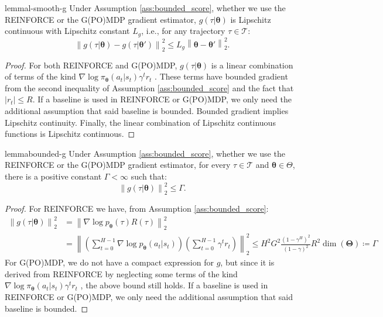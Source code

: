 \documentclass{article}
\makeatletter
\theoremstyle{remark}
\theoremstyle{definition}
\DeclareRobustCommand{\ie}{i.e.,\@\xspace}
\newcommand{\norm}[2][\infty]{\left\|#2\right\|_{#1}}
\newcommand{\vtheta}{\boldsymbol{\theta}}
\newcommand{\Tspace}{\mathcal{T}}
\newcommand{\score}[2]{\nabla\log p_{#1}(#2)}
\newcommand{\vTheta}{\boldsymbol{\Theta}}
\makeatother
\begin{document}
\begin{restatable}[]{lemma}{l-smooth-g}\label{lemma:gsmooth}
Under Assumption \ref{ass:bounded_score}, whether we use the REINFORCE or the G(PO)MDP gradient estimator, $g(\tau\vert\vtheta)$ is Lipschitz continuous with Lipschitz constant $L_g$, \ie for any trajectory $\tau\in\Tspace$:
\[
	\norm[2]{g(\tau\vert\vtheta)-g(\tau\vert\vtheta')}^2 \leq L_g\norm[2]{\vtheta-\vtheta'}^2.
\]
\end{restatable}
\begin{proof}
        For both REINFORCE and G(PO)MDP, $g(\tau\vert\vtheta)$ is a linear combination of terms of the kind $\nabla \log \pi_{\vtheta}(a_t\vert s_t)\gamma^t r_t$ \cite{peters2008reinforcement}. These terms have bounded gradient from the second inequality of Assumption \ref{ass:bounded_score} and the fact that $|r_t|\leq R$. If a baseline is used in REINFORCE or G(PO)MDP, we only need the additional assumption that said baseline is bounded.
        Bounded gradient implies Lipschitz continuity. Finally, the linear combination of Lipschitz continuous functions is Lipschitz continuous.
\end{proof}

\begin{restatable}[]{lemma}{bounded-g}\label{lemma:gbound}
Under Assumption \ref{ass:bounded_score}, whether we use the REINFORCE or the G(PO)MDP gradient estimator, for every $\tau\in\Tspace$ and $\vtheta\in\Theta$, there is a positive constant $\Gamma<\infty$ such that:
\[
	\norm[2]{g(\tau\vert\vtheta)}^2 \leq \Gamma.
\]
\end{restatable}
\begin{proof}
For REINFORCE we have, from Assumption \ref{ass:bounded_score}:
\begin{align*}
	\norm[2]{g(\tau\vert\vtheta)}^2 &=
	\norm[2]{\score{\vtheta}{\tau}R(\tau)}^2 \\
	&=\norm[2]{\left(\sum_{t=0}^{H-1}\score{\vtheta}{a_t\vert s_t}\right)\left(\sum_{t=0}^{H-1}\gamma^t r_t\right)}^2\leq H^2G^2\frac{(1-\gamma^H)^2}{(1-\gamma)^2}R^2\dim(\vTheta) \coloneqq \Gamma
\end{align*}
For G(PO)MDP, we do not have a compact expression for $g$, but since it is derived from REINFORCE by neglecting some terms of the kind $\nabla \log \pi_{\vtheta}(a_t | s_t)\gamma^t r_t$ \cite{baxter2001infinite,peters2008reinforcement}, the above bound still holds.
If a baseline is used in REINFORCE or G(PO)MDP, we only need the additional assumption that said baseline is bounded.
\end{proof}
\end{document}
